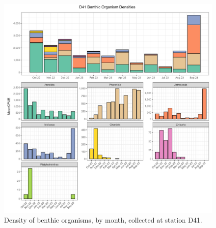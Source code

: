 \documentclass[
]{article}
\begin{document}
\begin{figure}

{\centering \includegraphics[width=9.84in,height=\textheight]{../figures/benthic_bar_d41.jpg}

}

\caption{\label{fig-benthic_d41}Density of benthic organisms, by month,
collected at station D41.}

\end{figure}
\end{document}
